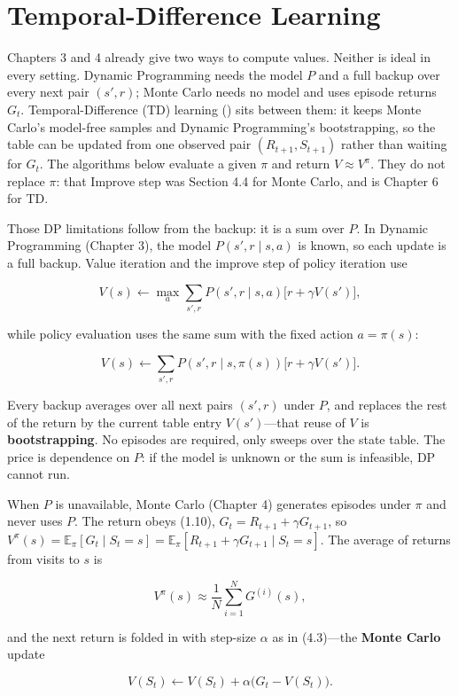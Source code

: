 \chapter{Temporal-Difference Learning}

Chapters 3 and 4 already give two ways to compute values. Neither is ideal in every setting. Dynamic Programming needs the model $P$ and a full backup over every next pair $(s',r)$; Monte Carlo needs no model and uses episode returns $G_t$. Temporal-Difference (TD) learning () sits between them: it keeps Monte Carlo's model-free samples and Dynamic Programming's bootstrapping, so the table can be updated from one observed pair $(R_{t+1},S_{t+1})$ rather than waiting for $G_t$. The algorithms below evaluate a given $\pi$ and return $V\approx V^\pi$. They do not replace $\pi$: that Improve step was Section 4.4 for Monte Carlo, and is Chapter 6 for TD.

Those DP limitations follow from the backup: it is a sum over $P$. In Dynamic Programming (Chapter 3), the model $P(s',r\mid s,a)$ is known, so each update is a full backup. Value iteration and the improve step of policy iteration use

\[
V(s)
\leftarrow
\max_a
\sum_{s',r}
P(s',r\mid s,a)\bigl[r+\gamma V(s')\bigr],
\]

while policy evaluation uses the same sum with the fixed action $a=\pi(s)$:

\[
V(s)
\leftarrow
\sum_{s',r}
P(s',r\mid s,\pi(s))\bigl[r+\gamma V(s')\bigr].
\]

Every backup averages over all next pairs $(s',r)$ under $P$, and replaces the rest of the return by the current table entry $V(s')$---that reuse of $V$ is \textbf{bootstrapping}. No episodes are required, only sweeps over the state table. The price is dependence on $P$: if the model is unknown or the sum is infeasible, DP cannot run.

When $P$ is unavailable, Monte Carlo (Chapter 4) generates episodes under $\pi$ and never uses $P$. The return obeys (1.10), $G_t=R_{t+1}+\gamma G_{t+1}$, so $V^\pi(s)=\mathbb{E}_\pi[G_t\mid S_t=s]=\mathbb{E}_\pi[R_{t+1}+\gamma G_{t+1}\mid S_t=s]$. The average of returns from visits to $s$ is

\[
V^\pi(s)
\approx
\frac{1}{N}\sum_{i=1}^{N} G^{(i)}(s),
\]

and the next return is folded in with step-size $\alpha$ as in (4.3)---the \textbf{Monte Carlo} update

\[
V(S_t)
\leftarrow
V(S_t)+\alpha\bigl(G_t-V(S_t)\bigr).
\]

